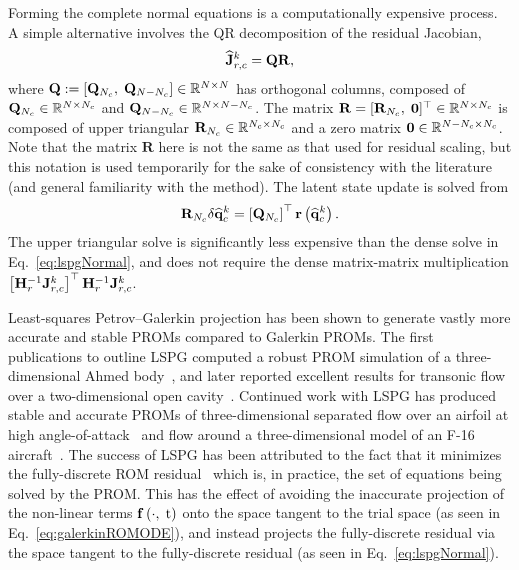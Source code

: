 Forming the complete normal equations is a computationally expensive process. A simple alternative involves the QR decomposition of the residual Jacobian,
%
\begin{equation}
    \mathbf{\widehat{J}}_{r,c}^{k} = \mathbf{QR},
\end{equation}
%
where $\mathbf{Q} := \left[\mathbf{Q}_{N_c}, \; \mathbf{Q}_{N-N_c}\right] \in \mathbb{R}^{N \times N}$ has orthogonal columns, composed of $\mathbf{Q}_{N_c} \in \mathbb{R}^{N \times N_c}$ and $\mathbf{Q}_{N - N_c} \in \mathbb{R}^{N \times N - N_c}$. The matrix $\mathbf{R} = [\mathbf{R}_{N_c}, \; \mathbf{0}]^\top \in \mathbb{R}^{N \times N_c}$ is composed of upper triangular $\mathbf{R}_{N_c} \in \mathbb{R}^{N_c \times N_c}$ and a zero matrix $\mathbf{0} \in \mathbb{R}^{N - N_c \times N_c}$. Note that the matrix $\mathbf{R}$ here is not the same as that used for residual scaling, but this notation is used temporarily for the sake of consistency with the literature (and general familiarity with the method). The latent state update is solved from
%
\begin{equation}
    \mathbf{R}_{N_c} \delta \mathbf{\widehat{q}}_{c}^{k} = \left[\mathbf{Q}_{N_c}\right]^\top \mathbf{r}\left(\mathbf{\widehat{q}}_{c}^{k}\right).
\end{equation}
%
The upper triangular solve is significantly less expensive than the dense solve in Eq.~\ref{eq:lspgNormal}, and does not require the dense matrix-matrix multiplication $\left[\resScaleInv \jacobResCons^{\newtonIdx}\right]^\top \resScaleInv \jacobResCons^{\newtonIdx}$.

Least-squares Petrov--Galerkin projection has been shown to generate vastly more accurate and stable PROMs compared to Galerkin PROMs. The first publications to outline LSPG computed a robust PROM simulation of a three-dimensional Ahmed body~\cite{Carlberg2010,Carlberg2013}, and later reported excellent results for transonic flow over a two-dimensional open cavity~\cite{Carlberg2017}. Continued work with LSPG has produced stable and accurate PROMs of three-dimensional separated flow over an airfoil at high angle-of-attack~\cite{Grimberg2020Hyper} and flow around a three-dimensional model of an F-16 aircraft~\cite{Grimberg2021}. The success of LSPG has been attributed to the fact that it minimizes the fully-discrete ROM residual~\cite{Grimberg2020} which is, in practice, the set of equations being solved by the PROM. This has the effect of avoiding the inaccurate projection of the non-linear terms $\mathbf{f} \left(\cdot, \; \text{t}\right)$ onto the space tangent to the trial space (as seen in Eq.~\ref{eq:galerkinROMODE}), and instead projects the fully-discrete residual via the space tangent to the fully-discrete residual (as seen in Eq.~\ref{eq:lspgNormal}).

